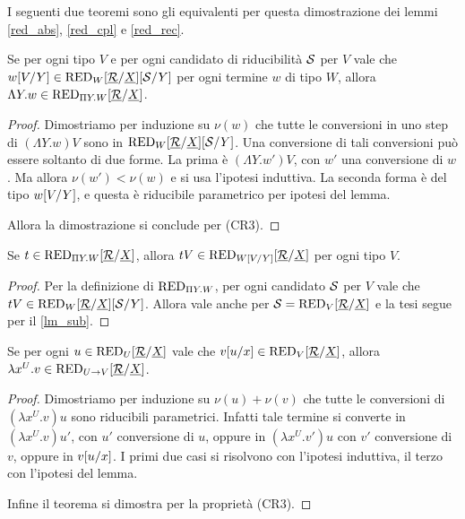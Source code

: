 \documentclass[]{marticle}
\begin{document}
I seguenti due teoremi sono gli equivalenti per questa dimostrazione dei lemmi
\ref{red_abs}, \ref{red_cpl} e \ref{red_rec}.
\begin{block} [Lemma]
    \label{red_gen}
    Se per ogni tipo $V$ e per ogni candidato di riducibilit\`a $\mathcal{S}$ per
    $V$ vale che $w[V/Y]\in\text{RED}_{W}[\underline{\mathcal{R}}/\underline{X}][\mathcal{S}/Y]$ per ogni termine
    $w$ di tipo $W$, allora $\Lambda Y. w\in\text{RED}_{\Pi Y.W}[\underline{\mathcal{R}}/\underline{X}]$.
\begin{proof}
    Dimostriamo per induzione su $\nu(w)$ che tutte le conversioni in uno step
    di $(\Lambda Y.w)V$ sono in $\text{RED}_{W} [\underline{\mathcal{R}}/\underline{X}][\mathcal{S}/Y]$. Una
    conversione di tali conversioni pu\`o essere soltanto di due forme.  La
    prima \`e $(\Lambda Y.w')V$, con $w'$ una conversione di $w$. Ma allora
    $\nu(w')<\nu(w)$ e si usa l'ipotesi induttiva. La seconda forma \`e del tipo
    $w[V/Y]$, e questa \`e riducibile parametrico per ipotesi del lemma. 

    Allora la dimostrazione si conclude per (CR3).
\end{proof}
\end{block}

\begin{block} [Lemma]
    \label{red_inst}
    Se $t\in \text{RED}_{\Pi Y.W}[\underline{\mathcal{R}}/\underline{X}]$, allora $tV\in \text{RED}_{W[V/Y]}[\underline{\mathcal{R}}/\underline{X}]$ per
    ogni tipo $V$.
\begin{proof}
    Per la definizione di $\text{RED}_{\Pi Y.W}$, per ogni candidato $\mathcal{S}$ per $V$
    vale che $tV\in \text{RED}_{W}[\underline{\mathcal{R}}/\underline{X}][\mathcal{S}/Y]$. Allora vale anche per
    $\mathcal{S} = \text{RED}_{V}[\underline{\mathcal{R}}/\underline{X}]$ e la tesi segue per il \ref{lm_sub}.
\end{proof}
\end{block}

\begin{block} [Lemma]
    Se per ogni $u\in \text{RED}_{U}[\underline{\mathcal{R}}/\underline{X}]$ vale che $v[u/x] \in \text{RED}_{V}[\underline{\mathcal{R}}/\underline{X}]$,
    allora $\lambda x^U.v\in \text{RED}_{U\rightarrow V}[\underline{\mathcal{R}}/\underline{X}]$.
\begin{proof}
    Dimostriamo per induzione su $\nu(u)+\nu(v)$ che tutte le conversioni di
    $(\lambda x^U.v)u$ sono riducibili parametrici. Infatti tale termine si
    converte in $(\lambda x^U.v)u'$, con $u'$ conversione di $u$, oppure in
    $(\lambda x^U.v')u$ con $v'$ conversione di $v$, oppure in $v[u/x]$. I
    primi due casi si risolvono con l'ipotesi induttiva, il terzo con l'ipotesi
    del lemma.

    Infine il teorema si dimostra per la propriet\`a (CR3).
\end{proof}
\end{block}
\end{document}
